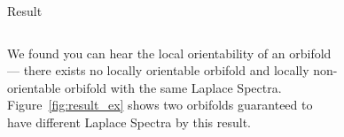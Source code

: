 \documentclass[final]{beamer}
\newlength{\onecolwid}
\begin{document}
\begin{frame}[t]
\begin{columns}[t]
\begin{column}{\onecolwid}
\begin{block}{Result}
    \begin{columns}[t]
        \begin{column}[t]{0.4\textwidth}
    We found you can hear the local orientability of an orbifold ---
    there exists no locally orientable orbifold and locally non-orientable orbifold
    with the same Laplace Spectra. Figure~\ref{fig:result_ex} shows two
    orbifolds guaranteed to have different Laplace Spectra by this result.
    \end{column}
    \begin{column}[t]{0.59\textwidth}
        \begin{figure}
        \begin{subfigure}[t]{0.49\textwidth}
            \includegraphics[width=\textwidth]{images/teardrop.png} 
        \end{subfigure}
        \begin{subfigure}[t]{0.49\textwidth}

\end{subfigure}
\end{figure}
\end{column}
\end{columns}
\end{block}
\end{column}
\end{columns}
\end{frame}
\end{document}

